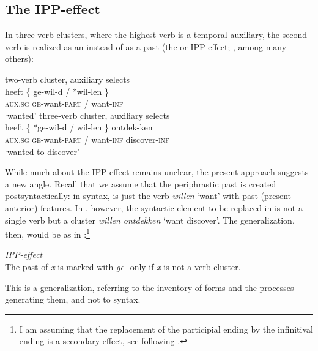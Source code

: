 \documentclass[output=paper]{LSP/langsci}
\begin{document}
\subsection{The IPP-effect}

In three-verb clusters, where the highest verb is a temporal auxiliary, the second verb is realized as an  instead of as a past  (the  or IPP effect; \citealt{Lange1981,Zwart2007,Schallert2014}, among many others):

\ea%
\label{ex:zwart:8}
\ea \label{ex:zwart:8a}
two-verb cluster, auxiliary selects \\
\gll     heeft  \{   ge-wil-d / *wil-len  \}\\
\textsc{aux.sg} {}  \textsc{ge}{}-want-\textsc{part} / want-\textsc{inf} {}\\
\glt ‘wanted’
\ex \label{ex:zwart:8b}
three-verb cluster, auxiliary selects \\
\gll     heeft  \{  *ge-wil-d / wil-len  \}  ontdek-ken\\
\textsc{aux.sg}  {}  \textsc{ge}{}-want-\textsc{part} / want-\textsc{inf} {} discover-\textsc{inf}\\
\glt     ‘wanted to discover’
\z
\z

While much about the IPP-effect remains unclear, the present approach suggests a new angle. Recall that we assume that the periphrastic past is created postsyntactically: in syntax,  is just the verb \textit{willen} ‘want’ with  past (present anterior) features. In , however, the syntactic element to be replaced in  is not a single verb but a cluster \textit{willen ontdekken} ‘want discover’. The generalization, then, would be as in :\footnote{I am assuming that the replacement of the participial ending by the infinitival ending is a secondary effect, see \citet[85]{Zwart2007} following \citet[128]{Paul1920}.}

\ea%
\label{ex:zwart:9}
\textit{IPP-effect}\\
The  past of \textit{x} is marked with \textit{ge-} only if \textit{x} is not a verb cluster.
\z

\noindent This is a  generalization, referring to the inventory of forms and the processes generating them, and not to syntax.
\end{document}
